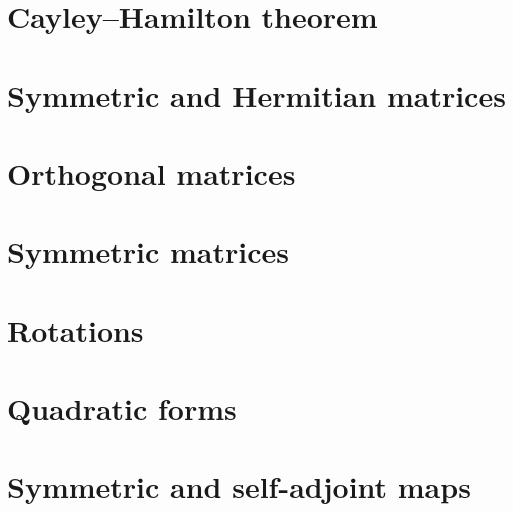 \documentclass[letter-paper]{tufte-book}
\begin{document}

\section{Cayley--Hamilton theorem}


\section{Symmetric and Hermitian matrices}


\section{Orthogonal matrices}


\section{Symmetric matrices}


\section{Rotations}


\section{Quadratic forms}


\section{Symmetric and self-adjoint maps}

\end{document}
